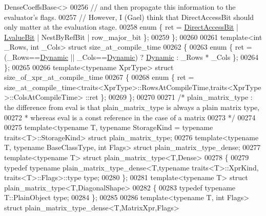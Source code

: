 \begin{DoxyCode}
{{       DenseCoeffsBase<>}
00256     \textcolor{comment}{// and then propagate this information to the evaluator's flags.}
00257     \textcolor{comment}{// However, I (Gael) think that DirectAccessBit should only matter at the evaluation stage.}
00258     \textcolor{keyword}{enum} \{ ret = \hyperlink{group__flags_gabf1e9d0516a933445a4c307ad8f14915}{DirectAccessBit} | \hyperlink{group__flags_gae2c323957f20dfdc6cb8f44428eaec1a}{LvalueBit} | NestByRefBit | row\_major\_bit \};
00259 \};
00260 
00261 \textcolor{keyword}{template}<\textcolor{keywordtype}{int} \_Rows, \textcolor{keywordtype}{int} \_Cols> \textcolor{keyword}{struct }size\_at\_compile\_time
00262 \{
00263   \textcolor{keyword}{enum} \{ ret = (\_Rows==\hyperlink{namespace_eigen_ad81fa7195215a0ce30017dfac309f0b2}{Dynamic} || \_Cols==\hyperlink{namespace_eigen_ad81fa7195215a0ce30017dfac309f0b2}{Dynamic}) ? \hyperlink{namespace_eigen_ad81fa7195215a0ce30017dfac309f0b2}{Dynamic} : \_Rows * \_Cols \};
00264 \};
00265 
00266 \textcolor{keyword}{template}<\textcolor{keyword}{typename} XprType> \textcolor{keyword}{struct }size\_of\_xpr\_at\_compile\_time
00267 \{
00268   \textcolor{keyword}{enum} \{ ret = size\_at\_compile\_time<traits<XprType>::RowsAtCompileTime,traits<XprType>::ColsAtCompileTime>
      ::ret \};
00269 \};
00270 
00271 \textcolor{comment}{/* plain\_matrix\_type : the difference from eval is that plain\_matrix\_type is always a plain matrix type,}
00272 \textcolor{comment}{ * whereas eval is a const reference in the case of a matrix}
00273 \textcolor{comment}{ */}
00274 
00275 template<typename T, typename StorageKind = typename traits<T>::StorageKind> \textcolor{keyword}{struct }plain\_matrix\_type;
00276 \textcolor{keyword}{template}<\textcolor{keyword}{typename} T, \textcolor{keyword}{typename} BaseClassType, \textcolor{keywordtype}{int} Flags> \textcolor{keyword}{struct }plain\_matrix\_type\_dense;
00277 \textcolor{keyword}{template}<\textcolor{keyword}{typename} T> \textcolor{keyword}{struct }plain\_matrix\_type<T,Dense>
00278 \{
00279   \textcolor{keyword}{typedef} \textcolor{keyword}{typename} plain\_matrix\_type\_dense<T,typename traits<T>::XprKind, traits<T>::Flags>::type type;
00280 \};
00281 \textcolor{keyword}{template}<\textcolor{keyword}{typename} T> \textcolor{keyword}{struct }plain\_matrix\_type<T,DiagonalShape>
00282 \{
00283   \textcolor{keyword}{typedef} \textcolor{keyword}{typename} T::PlainObject type;
00284 \};
00285 
00286 \textcolor{keyword}{template}<\textcolor{keyword}{typename} T, \textcolor{keywordtype}{int} Flags> \textcolor{keyword}{struct }plain\_matrix\_type\_dense<T,MatrixXpr,Flags>
}
\end{DoxyCode}
